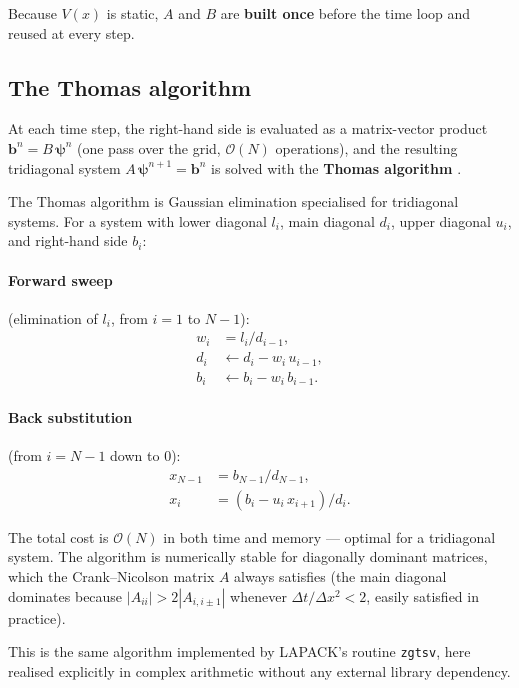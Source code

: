 \documentclass[12pt, a4paper]{article}
\newcommand{\dt}{\Delta t}
\newcommand{\dx}{\Delta x}
\newcommand{\CN}{Crank--Nicolson}
\begin{document}
Because $V(x)$ is static, $A$ and $B$ are \textbf{built once} before
the time loop and reused at every step.

\subsection{The Thomas algorithm}
\label{sec:thomas}

At each time step, the right-hand side is evaluated as a matrix-vector
product $\mathbf{b}^n = B\,\boldsymbol{\psi}^n$ (one pass over the grid,
$\mathcal{O}(N)$ operations), and the resulting tridiagonal system
$A\,\boldsymbol{\psi}^{n+1} = \mathbf{b}^n$ is solved with the
\textbf{Thomas algorithm} \cite{Thomas1949}.

The Thomas algorithm is Gaussian elimination specialised for tridiagonal
systems.  For a system with lower diagonal $l_i$, main diagonal $d_i$,
upper diagonal $u_i$, and right-hand side $b_i$:

\paragraph{Forward sweep} (elimination of $l_i$, from $i=1$ to $N-1$):
\begin{align}
  w_i &= l_i / d_{i-1}, \\
  d_i &\leftarrow d_i - w_i\,u_{i-1}, \\
  b_i &\leftarrow b_i - w_i\,b_{i-1}.
\end{align}

\paragraph{Back substitution} (from $i=N-1$ down to $0$):
\begin{align}
  x_{N-1} &= b_{N-1}/d_{N-1}, \\
  x_i     &= (b_i - u_i\,x_{i+1}) / d_i.
\end{align}

The total cost is $\mathcal{O}(N)$ in both time and memory — optimal for
a tridiagonal system.  The algorithm is numerically stable for
diagonally dominant matrices, which the \CN{} matrix $A$ always satisfies
(the main diagonal dominates because $|A_{ii}| > 2|A_{i,i\pm 1}|$
whenever $\dt/\dx^2 < 2$, easily satisfied in practice).

This is the same algorithm implemented by LAPACK's routine
\texttt{zgtsv}, here realised explicitly in complex arithmetic without
any external library dependency.
\end{document}
